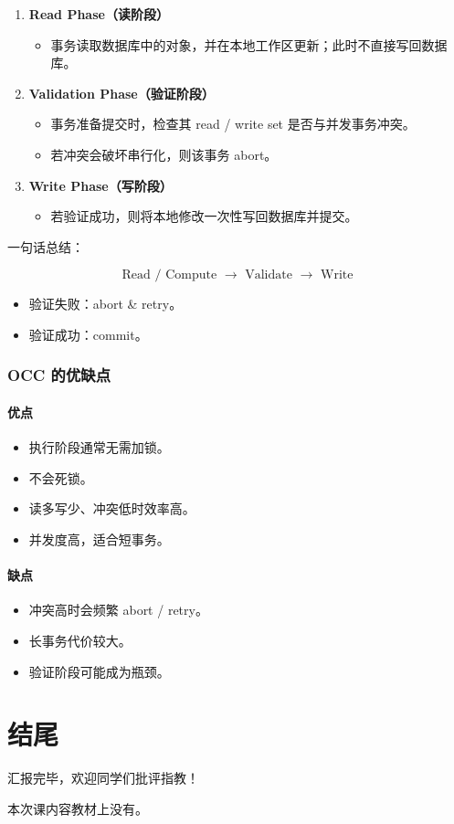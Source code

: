 \documentclass[UTF8,a4paper,11pt]{ctexart}
\begin{document}
\begin{enumerate}
  \item \textbf{Read Phase（读阶段）}
  \begin{itemize}
    \item 事务读取数据库中的对象，并在本地工作区更新；此时不直接写回数据库。
  \end{itemize}
  \item \textbf{Validation Phase（验证阶段）}
  \begin{itemize}
    \item 事务准备提交时，检查其 read / write set 是否与并发事务冲突。
    \item 若冲突会破坏串行化，则该事务 abort。
  \end{itemize}
  \item \textbf{Write Phase（写阶段）}
  \begin{itemize}
    \item 若验证成功，则将本地修改一次性写回数据库并提交。
  \end{itemize}
\end{enumerate}

一句话总结：

\[
\boxed{\text{Read / Compute } \rightarrow \text{ Validate } \rightarrow \text{ Write}}
\]

\begin{itemize}
  \item 验证失败：abort \& retry。
  \item 验证成功：commit。
\end{itemize}

\subsubsection{OCC 的优缺点}

\paragraph{优点}
\begin{itemize}
  \item 执行阶段通常无需加锁。
  \item 不会死锁。
  \item 读多写少、冲突低时效率高。
  \item 并发度高，适合短事务。
\end{itemize}

\paragraph{缺点}
\begin{itemize}
  \item 冲突高时会频繁 abort / retry。
  \item 长事务代价较大。
  \item 验证阶段可能成为瓶颈。
\end{itemize}

\section*{结尾}

汇报完毕，欢迎同学们批评指教！

本次课内容教材上没有。
\end{document}
